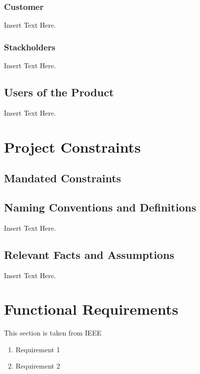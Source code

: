 \documentclass [12pt]{article}
\begin{document}
\subsubsection{Customer}
 Insert Text Here.

\subsubsection{Stackholders}
 Insert Text Here.

\subsection{Users of the Product} 
Insert Text Here.\\


\section{\textbf{Project Constraints}}


\subsection{Mandated Constraints}
\lipsum[1]  %
\subsection{Naming Conventions and Definitions}
	Insert Text Here.
	
\subsection{Relevant Facts and Assumptions} 
	Insert Text Here.



\section {Functional Requirements} 
This section is taken from IEEE

\begin{enumerate}[\textbf{VR-1:}]
	\setlength{\itemindent}{.2in}
	\itemsep0pt 
	\item Requirement 1
	\item Requirement 2

\end{enumerate}
\end{document}
